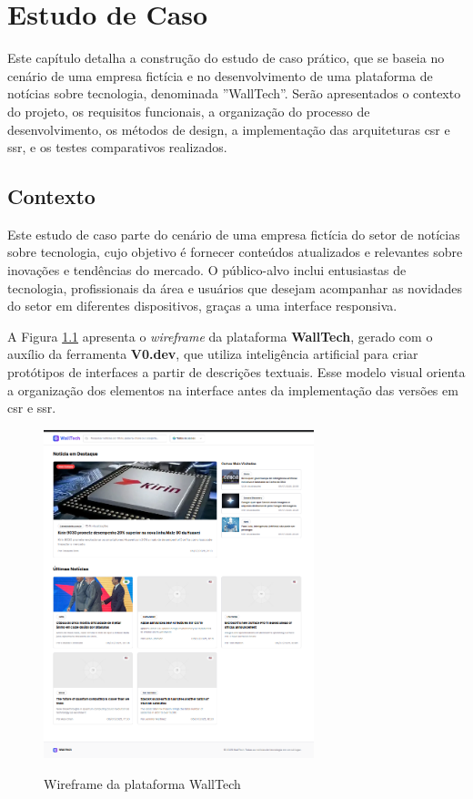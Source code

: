 \chapter{Estudo de Caso}
\label{cap:estudo_caso_dev}

Este capítulo detalha a construção do estudo de caso prático, que se baseia no cenário de uma empresa fictícia e no desenvolvimento de uma plataforma de notícias sobre tecnologia, denominada ''WallTech''. Serão apresentados o contexto do projeto, os requisitos funcionais, a organização do processo de desenvolvimento, os métodos de design, a implementação das arquiteturas \acrshort{csr} e \acrshort{ssr}, e os testes comparativos realizados.

\section{Contexto}
\label{section:contexto}

Este estudo de caso parte do cenário de uma empresa fictícia do setor de notícias sobre tecnologia, cujo objetivo é fornecer conteúdos atualizados e relevantes sobre inovações e tendências do mercado. O público-alvo inclui entusiastas de tecnologia, profissionais da área e usuários que desejam acompanhar as novidades do setor em diferentes dispositivos, graças a uma interface responsiva.

A Figura \ref{fig:wireframe-walltech} apresenta o \textit{wireframe} da plataforma \textbf{WallTech}, gerado com o auxílio da ferramenta \textbf{V0.dev}, que utiliza inteligência artificial para criar protótipos de interfaces a partir de descrições textuais. Esse modelo visual orienta a organização dos elementos na interface antes da implementação das versões em \acrshort{csr} e \acrshort{ssr}.

\begin{figure}[H]
  \centering
  \caption{Wireframe da plataforma WallTech}
  \includegraphics[width=0.7\textwidth]{media/wall_tech_wireframe.png}
  \label{fig:wireframe-walltech}
\end{figure}

